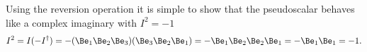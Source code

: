 %
%


Using the reversion operation it is simple to show that the  pseudoscalar
behaves like a complex imaginary with \( I^2 = -1 \)
\begin{dmath}\label{eqn:R3PseudoscalarSquare:3310}
I^2
=
I (-I^\dagger)
=
-
(\Be_1 \Be_2 \Be_3)(\Be_3 \Be_2 \Be_1)
=
-
\Be_1 \Be_2 \Be_2 \Be_1
=
-
\Be_1 \Be_1
=
-1.
\end{dmath}
